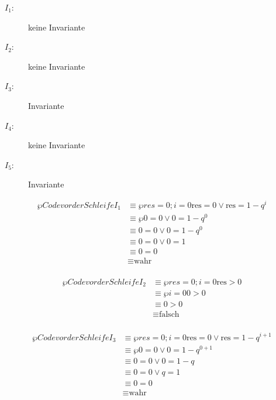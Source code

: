 \documentclass{bschlangaul-aufgabe}
\begin{document}
\begin{liAntwort}
\begin{description}
\item[$I_1$:] keine Invariante

\item[$I_2$:] keine Invariante

\item[$I_3$:] Invariante

\item[$I_4$:] keine Invariante

\item[$I_5$:] Invariante
\end{description}

%


\begin{align*}
\wp{Code vor der Schleife}{I_1}
& \equiv \wp{res = 0; i = 0}{\text{res} = 0 \lor \text{res} = 1 - q^i} \\
& \equiv \wp{}{0 = 0 \lor 0 = 1 - q^0} \\
& \equiv 0 = 0 \lor 0 = 1 - q^0 \\
& \equiv 0 = 0 \lor 0 = 1 \\
& \equiv 0 = 0 \\
& \equiv \text{wahr} \\
\end{align*}

\begin{align*}
\wp{Code vor der Schleife}{I_2}
& \equiv \wp{res = 0; i = 0}{\text{res} > 0} \\
& \equiv \wp{i = 0}{0 > 0} \\
& \equiv 0 > 0 \\
& \equiv \text{falsch} \\
\end{align*}

\begin{align*}
\wp{Code vor der Schleife}{I_3}
& \equiv \wp{res = 0; i = 0}{\text{res} = 0 \lor \text{res} = 1 - q^{i+1}} \\
& \equiv \wp{}{0 = 0 \lor 0 = 1 - q^{0+1}} \\
& \equiv 0 = 0 \lor 0 = 1 - q \\
& \equiv 0 = 0 \lor q = 1 \\
& \equiv 0 = 0 \\
& \equiv \text{wahr}\\
\end{align*}


\end{liAntwort}
\end{document}
